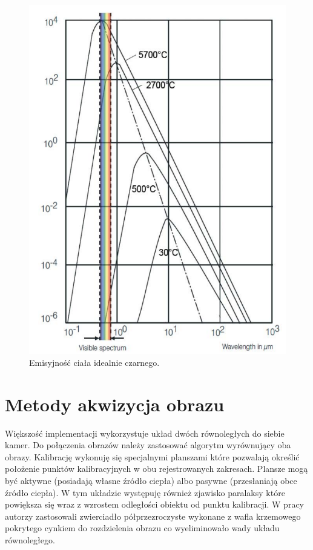 \begin{figure}
\centering
\includegraphics[width=0.4\linewidth]{images/perfect_black_emi}
\caption[Emisyjność ciała idealnie czarnego]{Emisyjność ciała idealnie czarnego.}
\label{fig:atmosfera_int}
\end{figure}

\section{Metody akwizycja obrazu}

Większość implementacji wykorzystuje układ dwóch równoległych do siebie kamer. Do połączenia obrazów należy zastosować algorytm wyrównujący oba obrazy. Kalibrację wykonuję się specjalnymi  planszami które pozwalają określić położenie punktów kalibracyjnych w obu rejestrowanych zakresach. Plansze mogą być aktywne (posiadają własne źródło ciepła) albo pasywne (przesłaniają obce źródło ciepła). W tym układzie występuję również zjawisko paralaksy które powiększa się wraz z wzrostem odległości obiektu od punktu kalibracji. W pracy  \cite{hwang2015multispectral} autorzy zastosowali zwierciadło półprzezroczyste wykonane z wafla krzemowego pokrytego cynkiem do rozdzielenia obrazu co wyeliminowało wady układu równoległego.

